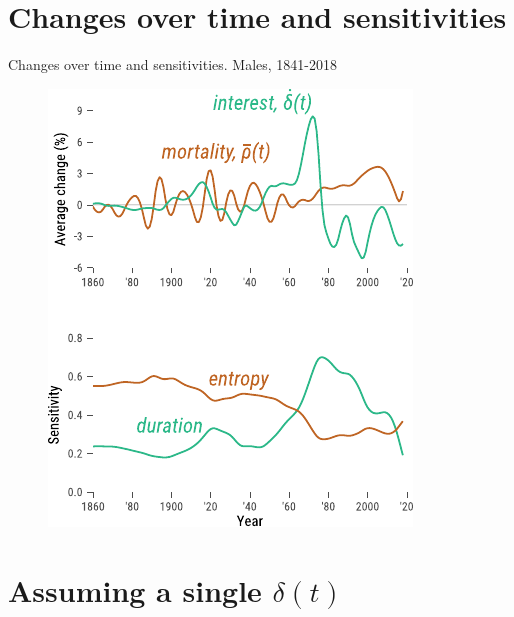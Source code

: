 \documentclass[10pt]{beamer}
\begin{document}
\section{Changes over time and sensitivities}

\begin{frame}{Changes over time and sensitivities. Males, 1841-2018}
\begin{figure}
	\centering
	\hspace*{-0.8cm}
	\includegraphics[scale=1.1] {Fig/IntMort.pdf}
\end{figure}
\end{frame}


\section{Assuming a single $\delta(t)$}
\end{document}
